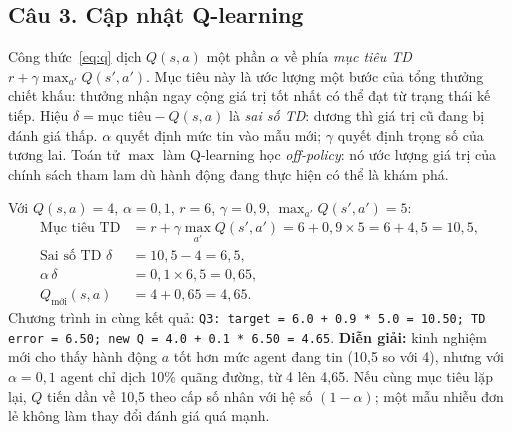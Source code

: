 \documentclass[12pt,a4paper]{report}
\begin{document}
\subsection*{Câu 3. Cập nhật Q-learning}
Công thức~\eqref{eq:q} dịch $Q(s,a)$ một phần $\alpha$ về phía \emph{mục tiêu TD}
$r+\gamma\max_{a'}Q(s',a')$. Mục tiêu này là ước lượng một bước của tổng thưởng
chiết khấu: thưởng nhận ngay cộng giá trị tốt nhất có thể đạt từ trạng thái kế tiếp.
Hiệu $\delta=\text{mục tiêu}-Q(s,a)$ là \emph{sai số TD}: dương thì giá trị cũ đang
bị đánh giá thấp. $\alpha$ quyết định mức tin vào mẫu mới; $\gamma$ quyết định trọng
số của tương lai. Toán tử $\max$ làm Q-learning học \emph{off-policy}: nó ước lượng
giá trị của chính sách tham lam dù hành động đang thực hiện có thể là khám phá.

Với $Q(s,a)=4$, $\alpha=0{,}1$, $r=6$, $\gamma=0{,}9$, $\max_{a'}Q(s',a')=5$:
\begin{align*}
\text{Mục tiêu TD} &= r+\gamma\max_{a'}Q(s',a')=6+0{,}9\times5=6+4{,}5=10{,}5,\\
\text{Sai số TD } \delta &= 10{,}5-4=6{,}5,\\
\alpha\,\delta &= 0{,}1\times6{,}5=0{,}65,\\
Q_{\text{mới}}(s,a) &= 4+0{,}65=4{,}65.
\end{align*}
Chương trình in cùng kết quả: \texttt{Q3: target = 6.0 + 0.9 * 5.0 = 10.50; TD
error = 6.50; new Q = 4.0 + 0.1 * 6.50 = 4.65}. \textbf{Diễn giải:} kinh nghiệm mới
cho thấy hành động $a$ tốt hơn mức agent đang tin (10{,}5 so với 4), nhưng với
$\alpha=0{,}1$ agent chỉ dịch 10\% quãng đường, từ 4 lên 4{,}65. Nếu cùng mục tiêu
lặp lại, $Q$ tiến dần về 10{,}5 theo cấp số nhân với hệ số $(1-\alpha)$; một mẫu
nhiễu đơn lẻ không làm thay đổi đánh giá quá mạnh.

\end{document}
